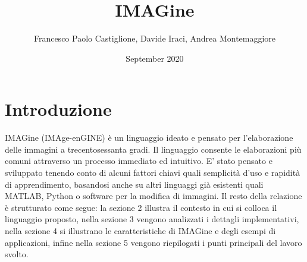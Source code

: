 \documentclass[10pt]{article}
\title{IMAGine}
\author{Francesco Paolo Castiglione, Davide Iraci, Andrea Montemaggiore}
\date{September 2020}
\begin{document}
	\maketitle
	\tableofcontents
	\newpage

\section{Introduzione}IMAGine (IMAge-enGINE) è un linguaggio ideato e pensato per l’elaborazione delle immagini a trecentosessanta gradi. Il linguaggio consente le elaborazioni più comuni attraverso un processo immediato ed intuitivo.
E’ stato pensato e sviluppato tenendo conto di alcuni fattori chiavi quali semplicità d’uso e rapidità di apprendimento, basandosi anche su altri linguaggi già esistenti quali MATLAB, Python o software per la modifica di immagini.\newline
Il resto della relazione è strutturato come segue: la sezione 2 illustra il contesto in cui si colloca il linguaggio proposto, nella sezione 3 vengono analizzati i dettagli implementativi, nella sezione 4 si illustrano le caratteristiche di IMAGine e degli esempi di applicazioni, infine nella sezione 5 vengono riepilogati i punti principali del lavoro svolto.\newpage
\end{document}

